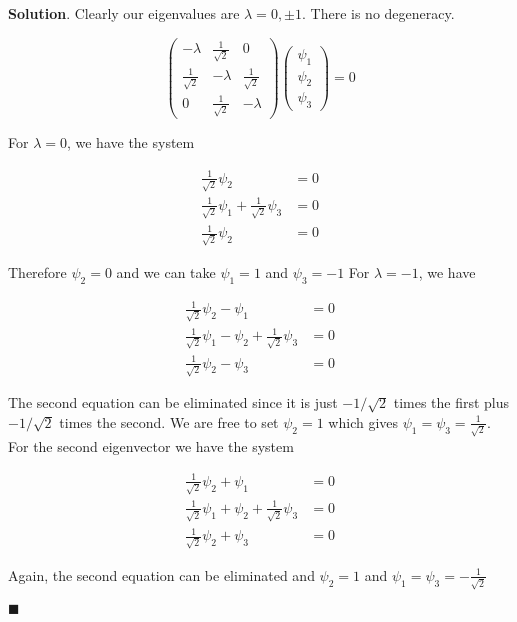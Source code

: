 \documentclass[12pt]{article}
\theoremstyle{definition}
\newenvironment{s}{%
        \begin{trivlist} \item \textbf{Solution}. }{%
            \hspace*{\fill} $\blacksquare$\end{trivlist}}%
\begin{document}
{\begin{s}
Clearly our eigenvalues are $\lambda = 0,\pm 1$. There is no degeneracy.

\begin{equation*}
\begin{pmatrix} -\lambda&\frac{1}{\sqrt{2}}&0\\\frac{1}{\sqrt{2}}&-\lambda&\frac{1}{\sqrt{2}}\\0&\frac{1}{\sqrt{2}}&-\lambda\end{pmatrix}
\begin{pmatrix}\psi_{1}\\\psi_{2}\\\psi_{3}\end{pmatrix} = 0
\end{equation*}

For $\lambda = 0$, we have the system

\begin{align*}
\frac{1}{\sqrt{2}}\psi_{2} &= 0\\
\frac{1}{\sqrt{2}}\psi_{1} + \frac{1}{\sqrt{2}}\psi_{3} &= 0\\
\frac{1}{\sqrt{2}}\psi_{2} &= 0
\end{align*}

Therefore $\psi_{2} = 0$ and we can take $\psi_{1} = 1$ and $ \psi_{3} = -1$ For $\lambda = -1$, we have

\begin{align*}
\frac{1}{\sqrt{2}}\psi_{2} - \psi_{1} &= 0\\
\frac{1}{\sqrt{2}}\psi_{1} - \psi_{2} + \frac{1}{\sqrt{2}}\psi_{3} &= 0\\
\frac{1}{\sqrt{2}}\psi_{2} - \psi_{3} &= 0
\end{align*}

The second equation can be eliminated since it is just $-1/\sqrt{2}$ times the first plus $-1/\sqrt{2}$ times the second. We are free to set $\psi_{2} = 1$ which gives $\psi_{1} = \psi_{3} = \frac{1}{\sqrt{2}}$. For the second eigenvector we have the system

\begin{align*}
\frac{1}{\sqrt{2}}\psi_{2} + \psi_{1} &= 0\\
\frac{1}{\sqrt{2}}\psi_{1} + \psi_{2} + \frac{1}{\sqrt{2}}\psi_{3} &= 0\\
\frac{1}{\sqrt{2}}\psi_{2} + \psi_{3} &= 0
\end{align*}

Again, the second equation can be eliminated and $\psi_{2}=1$ and $\psi_{1}=\psi_{3} = -\frac{1}{\sqrt{2}}$


\end{s}}
\end{document}
